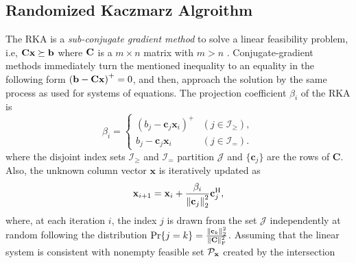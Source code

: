 \documentclass[12pt,draftcls,onecolumn]{IEEEtran}
\begin{document}
\subsection{Randomized Kaczmarz Algroithm}
\label{sec_RKA}
The RKA is a \emph{sub-conjugate gradient method} to solve a linear feasibility problem, i.e, $\mathbf{C}\mathbf{x}\succeq\mathbf{b}$ where $\mathbf{C}$ is a ${m\times n}$ matrix with $m>n$ \cite{leventhal2010randomized,strohmer2009randomized}. Conjugate-gradient methods immediately turn the mentioned inequality to an equality in the following form $\left(\mathbf{b}-\mathbf{C}\mathbf{x}\right)^{+}=0$,
and then, approach the solution by the same process as used for systems of equations. %
The projection coefficient $\beta_{i}$ of the RKA is \cite{leventhal2010randomized,briskman2015block}
\begin{equation}
\label{eq:22}
\beta_{i}= \begin{cases}
\left(b_{j}-\mathbf{c}_{j}\mathbf{x}_{i}\right)^{+} & \left(j \in \mathcal{I}_{\geq}\right), \\ b_{j}-\mathbf{c}_{j} \mathbf{x}_{i} & \left(j \in \mathcal{I}_{=}\right).
\end{cases}
\end{equation}
where the disjoint index sets $\mathcal{I}_{\geq}$ and $\mathcal{I}_{=}$ partition $\mathcal{J}$ and $\{\mathbf{c}_{j}\}$ are the rows of $\mathbf{C}$.
Also, the unknown column vector $\mathbf{x}$ is iteratively updated as
\begin{equation}
\label{eq:23}
\mathbf{x}_{i+1}=\mathbf{x}_{i}+\frac{\beta_{i}}{\left\|\mbc_{j}\right\|^{2}_{2}} \mbc^{\mathrm{H}}_{j},
\end{equation}
where, at each iteration $i$, the index $j$ is drawn from the set $\mathcal{J}$ independently at random following the distribution
$\operatorname{Pr}\{j=k\}=\frac{\left\|\mathbf{c}_{k}\right\|^{2}_{2}}{\|\mathbf{C}\|_{\mathrm{F}}^{2}}$.
Assuming that the linear system is consistent with nonempty feasible set $\mathcal{P}_{\mathbf{x}}$ created by the intersection
\end{document}
